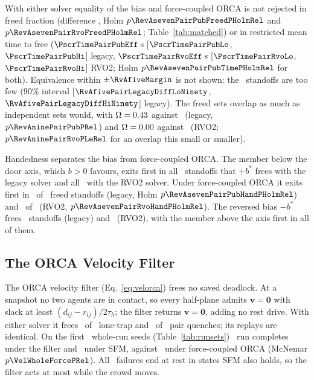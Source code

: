 With either solver equality of the bias and force-coupled ORCA is not rejected in freed fraction (difference \PscrPairPubDiff, Holm $p\RevAsevenPairPubFreedPHolmRel$ and $p\RevAsevenPairRvoFreedPHolmRel$; Table~\ref{tab:matched}) or in restricted mean time to free ($\PscrTimePairPubEff$\,s [$\PscrTimePairPubLo$, $\PscrTimePairPubHi$] legacy, $\PscrTimePairRvoEff$\,s [$\PscrTimePairRvoLo$, $\PscrTimePairRvoHi$] RVO2; Holm $p\RevAsevenPairPubTimePHolmRel$ for both). Equivalence within $\pm\RvAfiveMargin$ is not shown: the \PairN\ standoffs are too few (90\% interval [$\RvAfivePairLegacyDiffLoNinety$, $\RvAfivePairLegacyDiffHiNinety$] legacy). The freed sets overlap as much as independent sets would, with $\Omega=0.43$ against \RevAninePairPubEJ\ (legacy, $p\RevAninePairPubPRel$) and $\Omega=0.00$ against \PscrPairRvoEJ\ (RVO2; $p\RevAninePairRvoPLeRel$ for an overlap this small or smaller).

Handedness separates the bias from force-coupled ORCA. The member below the door axis, which $b>0$ favours, exits first in all \PairBsPubHand\ standoffs that $+b^\ast$ frees with the legacy solver and all \TabThreePairRvoHand\ with the RVO2 solver. Under force-coupled ORCA it exits first in \PairPubLower\ of \PairPubFreed\ freed standoffs (legacy, Holm $p\RevAsevenPairPubHandPHolmRel$) and \TabThreePairRvoOrcaLower\ of \PairRvoFreed\ (RVO2, $p\RevAsevenPairRvoHandPHolmRel$). The reversed bias $-b^\ast$ frees \PairBsPubMinusFreed\ standoffs (legacy) and \PscrPairBsRvoMinusFreed\ (RVO2), with the member above the axis first in all of them.

\subsection{The ORCA Velocity Filter}\label{sec:velorca}
The ORCA velocity filter (Eq.~\eqref{eq:velorca}) frees no saved deadlock. At a snapshot no two agents are in contact, so every half-plane admits $\mathbf v=\mathbf 0$ with slack at least $(d_{ij}-r_{ij})/2\tau_h$; the filter returns $\mathbf v=\mathbf 0$, adding no rest drive. With either solver it frees \VelLoneRvoK\ of \VelLoneN\ lone-trap and \VelPairRvoK\ of \VelPairN\ pair quenches; its replays are identical. On the first \VelWholeN\ whole-run seeds (Table~\ref{tab:runsets}) \VelWholeK\ run completes under the filter and \VelWholeSfmK\ under SFM, against \VelWholeForceK\ under force-coupled ORCA (McNemar $p\VelWholeForcePRel$). All \VelWholeFail\ failures end at rest in states SFM also holds, so the filter acts at most while the crowd moves.

